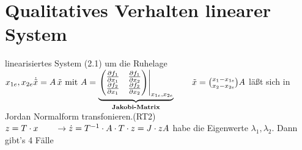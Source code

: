 \documentclass[ngerman]{tudscrreprt}
\begin{document}
\section{Qualitatives Verhalten linearer System}
linearisiertes System (2.1) um die Ruhelage $x_{1e}, x_{2e}\\
\dot{\tilde x} = A\, \tilde x \text{ mit } 
A= \underbrace{\left.\begin{pmatrix}
\frac{\partial f_1}{\partial x_1} & \frac{\partial f_1}{\partial x_2} \\
\frac{\partial f_2}{\partial x_1} & \frac{\partial f_2}{\partial x_2} 
\end{pmatrix}\right|_{x_{1e}, x_{2e}}}_{\text{\textbf{Jakobi-Matrix}}} \qquad \tilde x = \binom{x_1 - x_{1e}}{x_2 - x_{2e}}\\
A$ läßt sich in Jordan Normalform transfonieren.(RT2)\\
$z= T\cdot x \qquad \rightarrow \dot z = T^{-1} \cdot A \cdot T \cdot z = J\cdot z \\A$ habe die Eigenwerte $\lambda_1, \lambda_2$. Dann gibt's 4 Fälle
\end{document}
